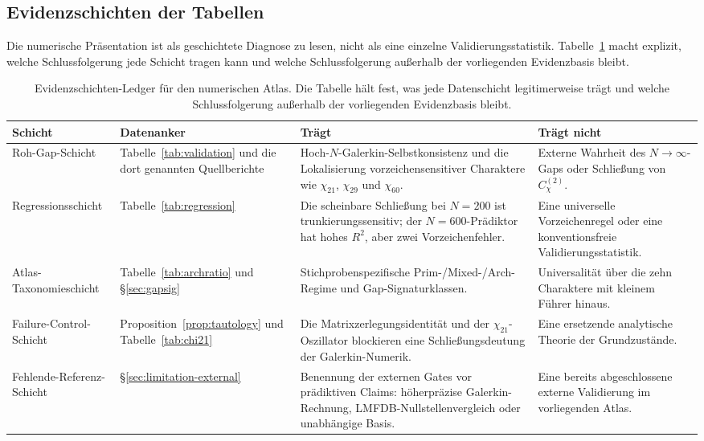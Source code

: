 \documentclass[a4paper,10pt,twocolumn]{article}
\theoremstyle{definition}
\theoremstyle{remark}
\newcommand{\chifn}{\chi}
\begin{document}
\subsection{Evidenzschichten der Tabellen}
\label{sec:validation-evidence-ledger}

Die numerische Präsentation ist als geschichtete Diagnose zu lesen, nicht
als eine einzelne Validierungsstatistik. Tabelle~\ref{tab:evidence-layer-ledger}
macht explizit, welche Schlussfolgerung jede Schicht tragen kann und
welche Schlussfolgerung außerhalb der vorliegenden Evidenzbasis bleibt.

\begin{table}[t]
\caption{Evidenzschichten-Ledger für den numerischen Atlas. Die Tabelle
  hält fest, was jede Datenschicht legitimerweise trägt und welche
  Schlussfolgerung außerhalb der vorliegenden Evidenzbasis bleibt.}
\label{tab:evidence-layer-ledger}
\centering
\footnotesize
\begin{tabular}{@{}p{}p{}p{}p{}@{}}
\toprule
Schicht & Datenanker & Trägt & Trägt nicht \\
\midrule
Roh-Gap-Schicht &
Tabelle~\ref{tab:validation} und die dort genannten Quellberichte &
Hoch-$N$-Galerkin-Selbstkonsistenz und die Lokalisierung
vorzeichensensitiver Charaktere wie $\chifn_{21}$, $\chifn_{29}$ und
$\chifn_{60}$. &
Externe Wahrheit des $N\to\infty$-Gaps oder Schließung von
$C^{(2)}_{\chifn}$. \\
\addlinespace
Regressionsschicht &
Tabelle~\ref{tab:regression} &
Die scheinbare Schließung bei $N=200$ ist trunkierungssensitiv; der
$N=600$-Prädiktor hat hohes $R^2$, aber zwei Vorzeichenfehler. &
Eine universelle Vorzeichenregel oder eine konventionsfreie
Validierungsstatistik. \\
\addlinespace
Atlas-Taxonomieschicht &
Tabelle~\ref{tab:archratio} und
\S\ref{sec:gapsig} &
Stichprobenspezifische Prim-/Mixed-/Arch-Regime und
Gap-Signaturklassen. &
Universalität über die zehn Charaktere mit kleinem Führer hinaus. \\
\addlinespace
Failure-Control-Schicht &
Proposition~\ref{prop:tautology} und
Tabelle~\ref{tab:chi21} &
Die Matrixzerlegungsidentität und der $\chifn_{21}$-Oszillator blockieren
eine Schließungsdeutung der Galerkin-Numerik. &
Eine ersetzende analytische Theorie der Grundzustände. \\
\addlinespace
Fehlende-Referenz-Schicht &
\S\ref{sec:limitation-external} &
Benennung der externen Gates vor prädiktiven Claims: höherpräzise
Galerkin-Rechnung, LMFDB-Nullstellenvergleich oder unabhängige Basis. &
Eine bereits abgeschlossene externe Validierung im vorliegenden Atlas. \\
\bottomrule
\end{tabular}
\end{table}
\end{document}
